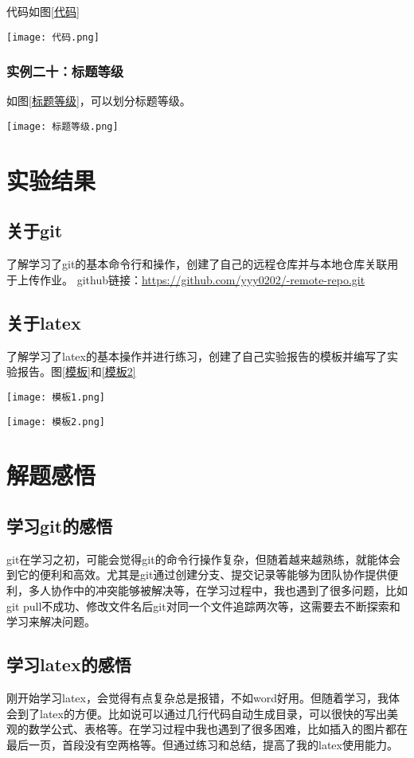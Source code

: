 \documentclass[a4paper]{article}
\begin{document}
代码如图\ref{代码}
    \begin{figure*}[!htb]
        \centering
        \texttt{[image: 代码.png]}
        \caption{代码}
        \label{代码}
    \end{figure*}

\subsubsection{实例二十：标题等级}
如图\ref{标题等级}，可以划分标题等级。
\begin{figure*}[!htb]
    \centering
    \texttt{[image: 标题等级.png]}
    \caption{标题等级}
    \label{标题等级}
\end{figure*}
\section{实验结果}
\subsection{关于git}
了解学习了git的基本命令行和操作，创建了自己的远程仓库并与本地仓库关联用于上传作业。
github链接：\href{https://github.com/yyy0202/-remote-repo.git}{https://github.com/yyy0202/-remote-repo.git}
\subsection{关于latex}
了解学习了latex的基本操作并进行练习，创建了自己实验报告的模板并编写了实验报告。图\ref{模板}和\ref{模板2}
\begin{figure*}[!h]
    \centering
    \texttt{[image: 模板1.png]}
    \caption{模板}
    \label{模板}
\end{figure*}
\begin{figure*}[!h]
    \centering
    \texttt{[image: 模板2.png]}
    \caption{模板}
    \label{模板2}
\end{figure*}
\section{解题感悟}
\subsection{学习git的感悟}
git在学习之初，可能会觉得git的命令行操作复杂，但随着越来越熟练，就能体会到它的便利和高效。尤其是git通过创建分支、提交记录等能够为团队协作提供便利，多人协作中的冲突能够被解决等，在学习过程中，我也遇到了很多问题，比如git pull不成功、修改文件名后git对同一个文件追踪两次等，这需要去不断探索和学习来解决问题。
\subsection{学习latex的感悟}
刚开始学习latex，会觉得有点复杂总是报错，不如word好用。但随着学习，我体会到了latex的方便。比如说可以通过几行代码自动生成目录，可以很快的写出美观的数学公式、表格等。在学习过程中我也遇到了很多困难，比如插入的图片都在最后一页，首段没有空两格等。但通过练习和总结，提高了我的latex使用能力。
\end{document}
